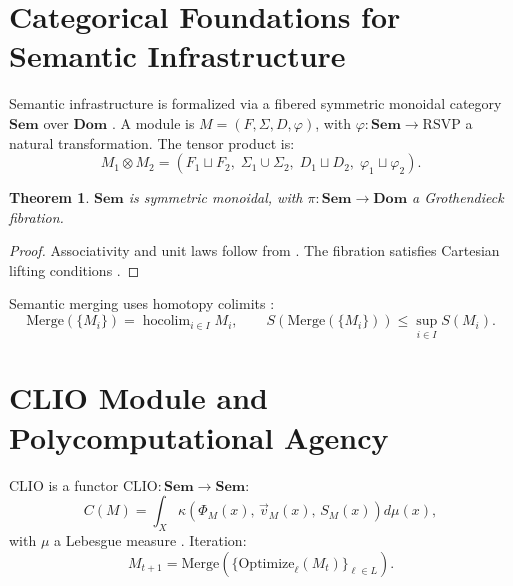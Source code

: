 \documentclass[11pt,a4paper]{article}
\theoremstyle{plain}
\newtheorem{theorem}{Theorem}
\theoremstyle{definition}
\theoremstyle{remark}
\begin{document}
\section{Categorical Foundations for Semantic Infrastructure}
\label{sec:categorical}

Semantic infrastructure is formalized via a fibered symmetric monoidal category
$\mathbf{Sem}$ over $\mathbf{Dom}$ \citep{baez2010}. A module is $M = (F,
\Sigma, D, \varphi)$, with $\varphi : \mathbf{Sem} \to \mathrm{RSVP}$ a
natural transformation. The tensor product is:
\[
  M_1 \otimes M_2
  = (F_1 \sqcup F_2,\;\Sigma_1 \cup \Sigma_2,\;D_1 \sqcup D_2,\;
     \varphi_1 \sqcup \varphi_2).
\]

\begin{theorem}
$\mathbf{Sem}$ is symmetric monoidal, with $\pi : \mathbf{Sem} \to
\mathbf{Dom}$ a Grothendieck fibration.
\end{theorem}
\begin{proof}
Associativity and unit laws follow from \citet{maclane1998}. The fibration
satisfies Cartesian lifting conditions \citep{lurie2009}.
\end{proof}

Semantic merging uses homotopy colimits \citep{lurie2009}:
\[
  \mathrm{Merge}(\{M_i\}) = \operatorname{hocolim}_{i \in I} M_i,
  \qquad
  S\!\left(\mathrm{Merge}(\{M_i\})\right) \leq \sup_{i \in I} S(M_i).
\]

\begin{center}
\end{center}

\section{CLIO Module and Polycomputational Agency}
\label{sec:clio}

CLIO is a functor $\mathrm{CLIO} : \mathbf{Sem} \to \mathbf{Sem}$:
\[
  C(M) = \int_{X} \kappa\!\left(\Phi_M(x),\,\vec{v}_M(x),\,S_M(x)\right)
  d\mu(x),
\]
with $\mu$ a Lebesgue measure \citep{cheng2025}. Iteration:
\[
  M_{t+1} = \mathrm{Merge}\!\left(\{\mathrm{Optimize}_\ell(M_t)\}_{\ell \in L}\right).
\]
\end{document}
